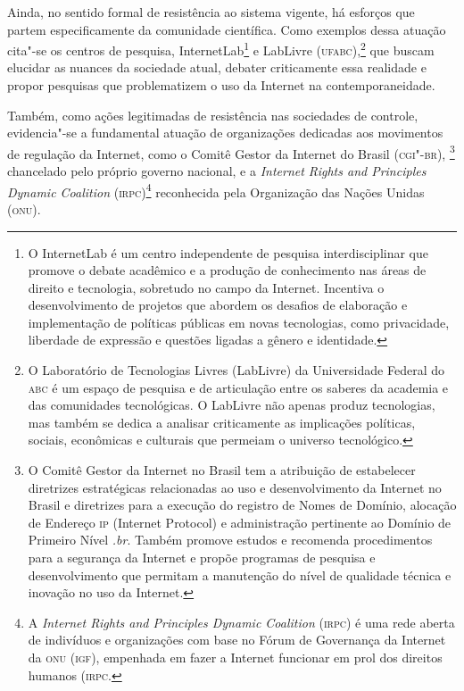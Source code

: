 Ainda, no sentido formal de resistência ao sistema vigente, há esforços
que partem especificamente da comunidade científica. Como exemplos dessa
atuação cita"-se os centros de pesquisa, InternetLab\footnote{O
  InternetLab é um centro independente de pesquisa interdisciplinar que
  promove o debate acadêmico e a produção de conhecimento nas áreas de
  direito e tecnologia, sobretudo no campo da Internet. Incentiva o
  desenvolvimento de projetos que abordem os desafios de elaboração e
  implementação de políticas públicas em novas tecnologias, como
  privacidade, liberdade de expressão e questões ligadas a gênero e
  identidade.} e LabLivre (\textsc{ufabc}),\footnote{O
  Laboratório de Tecnologias Livres (LabLivre) da Universidade Federal
  do \textsc{abc} é um espaço de pesquisa e de articulação entre os saberes da
  academia e das comunidades tecnológicas. O LabLivre não apenas produz
  tecnologias, mas também se dedica a analisar criticamente as
  implicações políticas, sociais, econômicas e culturais que permeiam o
  universo tecnológico.} que buscam elucidar as
nuances da sociedade atual, debater criticamente essa realidade e propor
pesquisas que problematizem o uso da Internet na contemporaneidade.

Também, como ações legitimadas de resistência nas sociedades de
controle, evidencia"-se a fundamental atuação de organizações dedicadas
aos movimentos de regulação da Internet, como o Comitê Gestor da
Internet do Brasil (\textsc{cgi"-br}), \footnote{O Comitê Gestor da Internet no
  Brasil tem a atribuição de estabelecer diretrizes estratégicas
  relacionadas ao uso e desenvolvimento da Internet no Brasil e
  diretrizes para a execução do registro de Nomes de Domínio, alocação
  de Endereço \textsc{ip} (Internet Protocol) e administração pertinente ao
  Domínio de Primeiro Nível \textit{.br}. Também promove estudos e recomenda
  procedimentos para a segurança da Internet e propõe programas de
  pesquisa e desenvolvimento que permitam a manutenção do nível de
  qualidade técnica e inovação no uso da Internet.}
chancelado pelo próprio governo nacional, e a \textit{Internet Rights
and Principles Dynamic Coalition} (\textsc{irpc})\footnote{A \textit{Internet
  Rights and Principles Dynamic Coalition} (\textsc{irpc}) é uma rede aberta de
  indivíduos e organizações com base no Fórum de Governança da Internet
  da \textsc{onu} (\textsc{igf}), empenhada em fazer a Internet funcionar em prol dos
  direitos humanos (\textsc{irpc}.} reconhecida pela Organização das Nações Unidas (\textsc{onu}).

